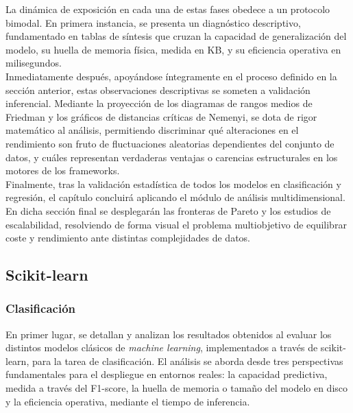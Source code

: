 \documentclass[a4paper,12pt,twoside,final]{book}
\begin{document}
La dinámica de exposición en cada una de estas fases obedece a un protocolo bimodal. En primera instancia, se presenta
un diagnóstico descriptivo, fundamentado en tablas de síntesis que cruzan la capacidad de generalización del modelo, su
huella de memoria física, medida en KB, y su eficiencia operativa en milisegundos.\\

Inmediatamente después, apoyándose íntegramente en el proceso definido en la sección anterior, estas observaciones
descriptivas se someten a validación inferencial. Mediante la proyección de los diagramas de rangos medios de Friedman y
los gráficos de distancias críticas de Nemenyi, se dota de rigor matemático al análisis, permitiendo discriminar qué
alteraciones en el rendimiento son fruto de fluctuaciones aleatorias dependientes del conjunto de datos, y cuáles
representan verdaderas ventajas o carencias estructurales en los motores de los frameworks.\\

Finalmente, tras la validación estadística de todos los modelos en clasificación y regresión, el capítulo concluirá
aplicando el módulo de análisis multidimensional. En dicha sección final se desplegarán las fronteras de Pareto y los
estudios de escalabilidad, resolviendo de forma visual el problema multiobjetivo de equilibrar coste y rendimiento ante
distintas complejidades de datos.

\subsection{Scikit-learn}
\subsubsection{Clasificación}
En primer lugar, se detallan y analizan los resultados obtenidos al evaluar los distintos modelos clásicos de
\textit{machine learning}, implementados a través de scikit-learn, para la tarea de clasificación. El análisis se
aborda desde tres perspectivas fundamentales para el despliegue en entornos reales: la capacidad predictiva, medida
a través del F1-score, la huella de memoria o tamaño del modelo en disco y la eficiencia operativa, mediante el tiempo
de inferencia.

\newpage
\end{document}
